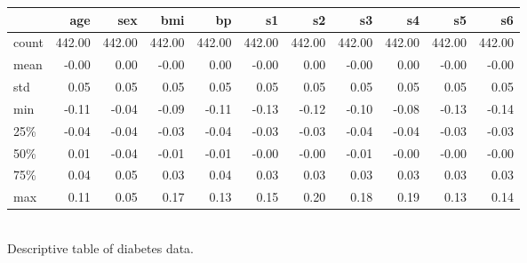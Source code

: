 \begin{tabular}{lrrrrrrrrrr}
\toprule
{} &    age &    sex &    bmi &     bp &     s1 &     s2 &     s3 &     s4 &     s5 &     s6 \\
\midrule
count & 442.00 & 442.00 & 442.00 & 442.00 & 442.00 & 442.00 & 442.00 & 442.00 & 442.00 & 442.00 \\
mean  &  -0.00 &   0.00 &  -0.00 &   0.00 &  -0.00 &   0.00 &  -0.00 &   0.00 &  -0.00 &  -0.00 \\
std   &   0.05 &   0.05 &   0.05 &   0.05 &   0.05 &   0.05 &   0.05 &   0.05 &   0.05 &   0.05 \\
min   &  -0.11 &  -0.04 &  -0.09 &  -0.11 &  -0.13 &  -0.12 &  -0.10 &  -0.08 &  -0.13 &  -0.14 \\
25\%   &  -0.04 &  -0.04 &  -0.03 &  -0.04 &  -0.03 &  -0.03 &  -0.04 &  -0.04 &  -0.03 &  -0.03 \\
50\%   &   0.01 &  -0.04 &  -0.01 &  -0.01 &  -0.00 &  -0.00 &  -0.01 &  -0.00 &  -0.00 &  -0.00 \\
75\%   &   0.04 &   0.05 &   0.03 &   0.04 &   0.03 &   0.03 &   0.03 &   0.03 &   0.03 &   0.03 \\
max   &   0.11 &   0.05 &   0.17 &   0.13 &   0.15 &   0.20 &   0.18 &   0.19 &   0.13 &   0.14 \\
\bottomrule
\end{tabular}
\\\caption{Descriptive table of diabetes data.}